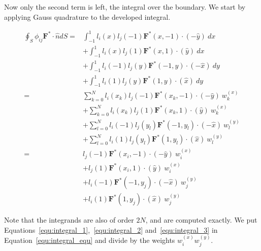 Now only the second term is left, the integral over the boundary. We start by applying Gauss
quadrature to the developed integral.

\begin{equation} \label{equ:integral_2}
	\begin{split}
        \oint_{S} \phi_{i j}\mathbf{F}^* \cdot \widehat{n}dS = & 
        \int_{-1}^{1}l_i(x) l_j(-1)\mathbf{F}^*(x, -1) \cdot (-\widehat{y}) \: dx \\
        & + \int_{-1}^{1}l_i(x) l_j(1)\mathbf{F}^*(x, 1) \cdot (\widehat{y}) \: dx \\
        & + \int_{-1}^{1}l_i(-1) l_j(y)\mathbf{F}^*(-1, y) \cdot (-\widehat{x}) \: dy \\
        & + \int_{-1}^{1}l_i(1) l_j(y)\mathbf{F}^*(1, y) \cdot (\widehat{x}) \: dy \\
        = & \sum_{k = 0}^{N}l_i(x_k)l_j(-1)\mathbf{F}^*(x_k, -1)\cdot (-\widehat{y}) \: w_k^{(x)} \\
        & + \sum_{k = 0}^{N}l_i(x_k)l_j(1)\mathbf{F}^*(x_k, 1)\cdot (\widehat{y}) \: w_k^{(x)} \\
        & + \sum_{l = 0}^{N}l_i(-1)l_j(y_l)\mathbf{F}^*(-1, y_l)\cdot (-\widehat{x}) \: w_l^{(y)} \\
        & + \sum_{l = 0}^{N}l_i(1)l_j(y_l)\mathbf{F}^*(1, y_l)\cdot (\widehat{x}) \: w_l^{(y)} \\
        = & l_j(-1)\mathbf{F}^*(x_i, -1)\cdot (-\widehat{y}) \: w_i^{(x)} \\
        & + l_j(1)\mathbf{F}^*(x_i, 1)\cdot (\widehat{y}) \: w_i^{(x)} \\
        & + l_i(-1)\mathbf{F}^*(-1, y_j)\cdot (-\widehat{x}) \: w_j^{(y)} \\
        & + l_i(1)\mathbf{F}^*(1, y_j)\cdot (\widehat{x}) \: w_j^{(y)}
	\end{split}
\end{equation}

Note that the integrands are also of order \(2 N\), and are computed exactly. We put
Equations~\ref{equ:integral_1},~\ref{equ:integral_2} and~\ref{equ:integral_3} in
Equation~\ref{equ:integral_equ} and divide by the weights \(w_i^{ \left( x \right) } w_j^{ \left( y
\right) }\).

